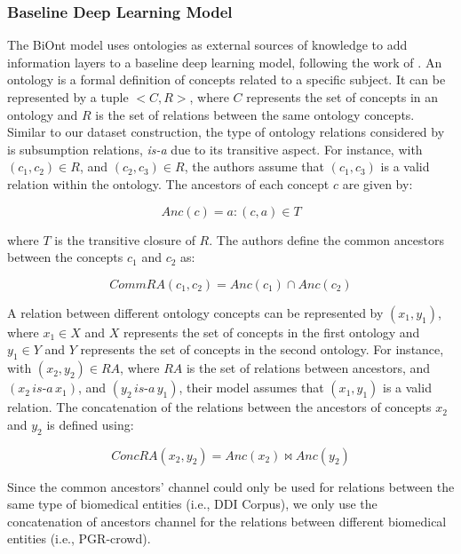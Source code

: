 \subsubsection{Baseline Deep Learning Model}

The BiOnt model uses ontologies as external sources of knowledge to add information layers to a baseline deep learning model, following the work of \cite{lamurias2019bo}. An ontology is a formal definition of concepts related to a specific subject. It can be represented by a tuple $<C, R>$, where $C$ represents the set of concepts in an ontology and $R$ is the set of relations between the same ontology concepts. Similar to our dataset construction, the type of ontology relations considered by \cite{sousa2020biont} is subsumption relations, \textit{is-a} due to its transitive aspect. For instance, with $(c_1, c_2) \in R$, and $(c_2, c_3) \in R$, the authors assume that $(c_1, c_3)$ is a valid relation within the ontology. The ancestors of each concept $c$ are given by:

\begin{equation}
Anc(c) = a : (c, a) \in T
\label{equation:ancestors}
\end{equation}

where $T$ is the transitive closure of $R$. The authors define the common ancestors between the concepts $c_1$ and $c_2$ as:

\begin{equation}
CommRA(c_1, c_2) = Anc(c_1) \cap Anc(c_2)
\label{equation:commonancestors}
\end{equation}

A relation between different ontology concepts can be represented by $(x_1, y_1)$, where $x_1 \in X$ and $X$ represents the set of concepts in the first ontology and $y_1 \in Y$ and $Y$ represents the set of concepts in the second ontology. For instance, with $(x_2, y_2) \in RA$, where $RA$ is the set of relations between ancestors, and $(x_2\,\textit{is-a}\,x_1)$, and $(y_2\,\textit{is-a}\,y_1)$, their model assumes that $(x_1, y_1)$ is a valid relation. The concatenation of the relations between the ancestors of concepts $x_2$ and $y_2$ is defined using:

\begin{equation}
ConcRA(x_2, y_2) = Anc(x_2) \Join Anc(y_2)
\label{equation:cancestors}
\end{equation}

Since the common ancestors' channel could only be used for relations between the same type of biomedical entities (i.e., DDI Corpus), we only use the concatenation of ancestors channel for the relations between different biomedical entities (i.e., PGR-crowd). 

